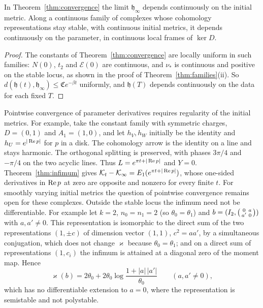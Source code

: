 \begin{corollary}\label{cor:continuity}
In Theorem~\ref{thm:convergence} the limit $\mathfrak h_\infty$ depends continuously on
the initial metric. Along a continuous family of complexes whose cohomology
representations stay stable, with continuous initial metrics, it depends
continuously on the parameter, in continuous local frames of $\ker D$.
\end{corollary}

\begin{proof}
The constants of Theorem~\ref{thm:convergence} are locally uniform in such
families: $N(0)$, $t_2$ and $\mathcal E(0)$ are continuous, and $\nu_*$ is
continuous and positive on the stable locus, as shown in the proof of
Theorem~\ref{thm:families}(ii). So $d(\mathfrak h(t),\mathfrak h_\infty)\leq\mathfrak Ce^{-\beta t}$ uniformly,
and $\mathfrak h(T)$ depends continuously on the data for each fixed $T$.
\end{proof}


Pointwise convergence of parameter derivatives requires regularity of the
initial metrics. For example, take the constant family with symmetric
charges, $D=(0,1)$ and $A_1=(1,0)$, and let $h_V,h_W$ initially be
the identity and $h_U=e^{|\operatorname{Re} p|}$ for $p$ in a disk. The cohomology
arrow is the identity on a line and stays harmonic. The orthogonal
splitting is preserved, with phases $3\pi/4$ and $-\pi/4$ on the two
acyclic lines. Thus $L=e^{\pi t+|\operatorname{Re} p|}$ and $Y=0$.
Theorem~\ref{thm:infimum} gives $\mathcal K_t-\mathcal K_\infty=E_1(e^{\pi t+|\operatorname{Re} p|})$,
whose one-sided derivatives in $\operatorname{Re} p$ at zero are opposite and
nonzero for every finite $t$. For smoothly varying initial metrics the
question of pointwise convergence remains open for these complexes. Outside the stable locus the infimum need not be differentiable.
For example let $k=2$, $n_0=n_1=2$ (so $\theta_0=\theta_1$) and
$b=(I_2,\left(\begin{smallmatrix}0&a\\a'&0\end{smallmatrix}\right))$ with
$a,a'\neq0$. This representation is isomorphic to the direct sum of the two
representations $(1,\pm c)$ of dimension vector $(1,1)$, $c^2=aa'$, by a
simultaneous conjugation, which does not change $\varkappa$ because
$\theta_0=\theta_1$; and on a direct sum of representations $(1,c_i)$ the
infimum is attained at a diagonal zero of the moment map. Hence
\[
 \varkappa(b)=2\theta_0+2\theta_0\log\frac{1+|a|\,|a'|}{\theta_0}\qquad(a,a'\neq0),
\]
which has no differentiable extension to $a=0$, where the representation is
semistable and not polystable.
